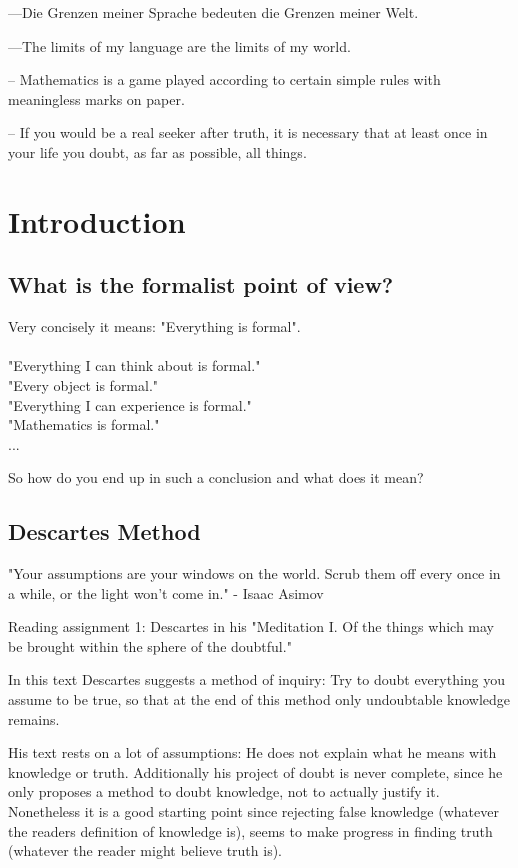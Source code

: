 \begin{savequote}
---Die Grenzen meiner Sprache bedeuten die Grenzen meiner Welt.

---The limits of my language are the limits of my world.

-- Mathematics is a game played according to certain simple rules with meaningless marks on paper. 

-- If you would be a real seeker after truth, it is necessary that at least once in your life you doubt, as far as possible, all things.
\end{savequote}


\chapter{Introduction}
\section{What is the formalist point of view?}
Very concisely it means: "Everything is formal". \\ \\
"Everything I can think about is formal." \\
"Every object is formal." \\
"Everything I can experience is formal." \\
"Mathematics is formal." \\
...


So how do you end up in such a conclusion and what does it mean?

\section{Descartes Method}
"Your assumptions are your windows on the world. Scrub them off every once in a while, or the light won’t come in." - Isaac Asimov

Reading assignment 1:  Descartes in his "Meditation I. Of the things which may be brought within the sphere of the doubtful." 

In this text Descartes suggests a method of inquiry: Try to doubt everything you assume to be true, so that at the end of this method only undoubtable knowledge remains. 

His text rests on a lot of assumptions: He does not explain what he means with knowledge or truth. Additionally his project of doubt is never complete, since he only proposes a method to doubt knowledge, not to actually justify it.
Nonetheless it is a good starting point since rejecting false knowledge (whatever the readers definition of knowledge is), seems to make progress in finding truth (whatever the reader might believe truth is).

